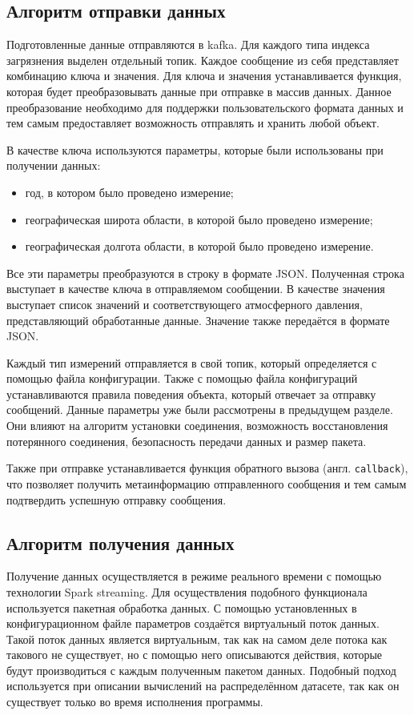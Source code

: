 \subsection{Алгоритм отправки данных}

Подготовленные данные отправляются в kafka.
Для каждого типа индекса загрязнения выделен отдельный топик.
Каждое сообщение из себя представляет комбинацию ключа и значения.
Для ключа и значения устанавливается функция, которая будет преобразовывать данные при отправке в массив данных.
Данное преобразование необходимо для поддержки пользовательского формата данных и тем самым предоставляет возможность отправлять и хранить любой объект.

В качестве ключа используются параметры, которые были использованы при получении данных:
\begin{itemize}
    \item год, в котором было проведено измерение;
    \item географическая широта области, в которой было проведено измерение;
    \item географическая долгота области, в которой было проведено измерение.
\end{itemize}

Все эти параметры преобразуются в строку в формате JSON.
Полученная строка выступает в качестве ключа в отправляемом сообщении.
В качестве значения выступает список значений и соответствующего атмосферного давления, представляющий обработанные данные.
Значение также передаётся в формате JSON.

Каждый тип измерений отправляется в свой топик, который определяется с помощью файла конфигурации.
Также с помощью файла конфигураций устанавливаются правила поведения объекта, который отвечает за отправку сообщений.
Данные параметры уже были рассмотрены в предыдущем разделе.
Они влияют на алгоритм установки соединения, возможность восстановления потерянного соединения, безопасность передачи данных и размер пакета.

Также при отправке устанавливается функция обратного вызова (англ. \texttt{callback}), что позволяет получить метаинформацию отправленного сообщения и тем самым подтвердить успешную отправку сообщения.


\subsection{Алгоритм получения данных}

Получение данных осуществляется в режиме реального времени с помощью технологии Spark streaming.
Для осуществления подобного функционала используется пакетная обработка данных.
С помощью установленных в конфигурационном файле параметров создаётся виртуальный поток данных.
Такой поток данных является виртуальным, так как на самом деле потока как такового не существует, но с помощью него описываются действия, которые будут производиться с каждым полученным пакетом данных.
Подобный подход используется при описании вычислений на распределённом датасете, так как он существует только во время исполнения программы.

